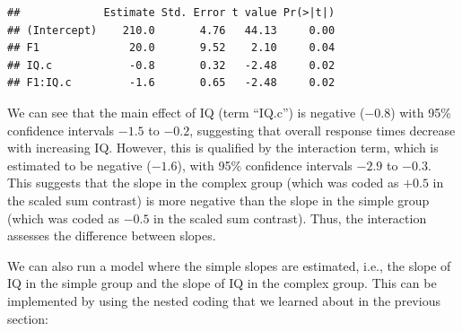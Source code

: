 \documentclass[12pt,]{krantz}
\newenvironment{Shaded}{\begin{snugshade}}{\end{snugshade}}
\newcommand{\DataTypeTok}[1]{\textcolor[rgb]{0.13,0.29,0.53}{#1}}
\newcommand{\DecValTok}[1]{\textcolor[rgb]{0.00,0.00,0.81}{#1}}
\newcommand{\FloatTok}[1]{\textcolor[rgb]{0.00,0.00,0.81}{#1}}
\newcommand{\KeywordTok}[1]{\textcolor[rgb]{0.13,0.29,0.53}{\textbf{#1}}}
\newcommand{\NormalTok}[1]{#1}
\newcommand{\OperatorTok}[1]{\textcolor[rgb]{0.81,0.36,0.00}{\textbf{#1}}}
\newcommand{\StringTok}[1]{\textcolor[rgb]{0.31,0.60,0.02}{#1}}
\begin{document}
\begin{Shaded}
\end{Shaded}

\begin{Shaded}
\end{Shaded}

\begin{verbatim}
##             Estimate Std. Error t value Pr(>|t|)
## (Intercept)    210.0       4.76   44.13     0.00
## F1              20.0       9.52    2.10     0.04
## IQ.c            -0.8       0.32   -2.48     0.02
## F1:IQ.c         -1.6       0.65   -2.48     0.02
\end{verbatim}

We can see that the main effect of IQ (term ``IQ.c'') is negative (\(-0.8\)) with 95\% confidence intervals \(-1.5\) to \(-0.2\), suggesting that overall response times decrease with increasing IQ. However, this is qualified by the interaction term, which is estimated to be negative (\(-1.6\)), with 95\% confidence intervals \(-2.9\) to \(-0.3\). This suggests that the slope in the complex group (which was coded as \(+0.5\) in the scaled sum contrast) is more negative than the slope in the simple group (which was coded as \(-0.5\) in the scaled sum contrast). Thus, the interaction assesses the difference between slopes.

We can also run a model where the simple slopes are estimated, i.e., the slope of IQ in the simple group and the slope of IQ in the complex group. This can be implemented by using the nested coding that we learned about in the previous section:
\end{document}

